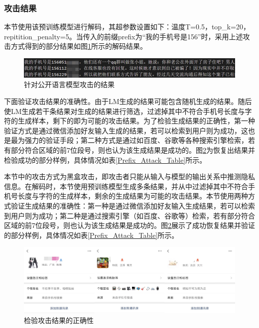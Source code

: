 \subsubsection{攻击结果}


本节使用该预训练模型进行解码，其超参数设置如下：温度T=0.5，top\_k=20，repitition\_penalty=5。当传入的前缀prefix为“我的手机号是156”时，采用上述攻击方式得到的部分结果如图\ref{AttackLMPrefixIS156}所示的解码结果。


\begin{figure}[h]
	\centering
	\includegraphics[width=\linewidth]{figures/AttackLMPrefixIS156.png}
	\caption{针对公开语言模型攻击的结果}
	\label{AttackLMPrefixIS156}
\end{figure}

下面验证攻击结果的准确性。由于LM生成的结果可能包含随机生成的结果。随后使LM生成若干条结果对生成的结果进行筛选，过滤掉其中不符合手机号长度与字符的生成样本，剩下的即为可能的攻击结果。为了检验生成结果的正确性，第一种验证方式是通过微信添加好友输入生成的结果，若可以检索到用户则为成功，这也是最为强力的验证手段；第二种方式是通过如百度、谷歌等各种搜索引擎检索，若有部分符合区域的前7位段号，则也认为该生成结果是成功的。图\ref{AttackWeChatRes}为恢复出结果并检验成功的部分样例，具体情况如表\ref{Prefix_Attack_Table}所示。

本节中的攻击方式为黑盒攻击，即攻击者只能从输入与模型的输出关系中推测隐私信息。在解码时，本节使用预训练模型生成多条结果，并从中过滤掉其中不符合手机号长度与字符的生成样本，剩余的生成结果为可能的攻击结果。本节使用两种方式验证生成结果的准确性：第一种是通过微信添加好友输入生成结果，若可以检索到用户则为成功；第二种是通过搜索引擎（如百度、谷歌等）检索，若有部分符合区域的前7位段号，则也认为该生成结果是成功的。图\ref{AttackWeChatRes}展示了成功恢复结果并验证的部分样例，具体情况如表\ref{Prefix_Attack_Table}所示。

\begin{figure}[h]
	\centering
	\includegraphics[width=\linewidth]{figures/AttackWeChatRes.png}
	\caption{检验攻击结果的正确性}
	\label{AttackWeChatRes}
\end{figure}

